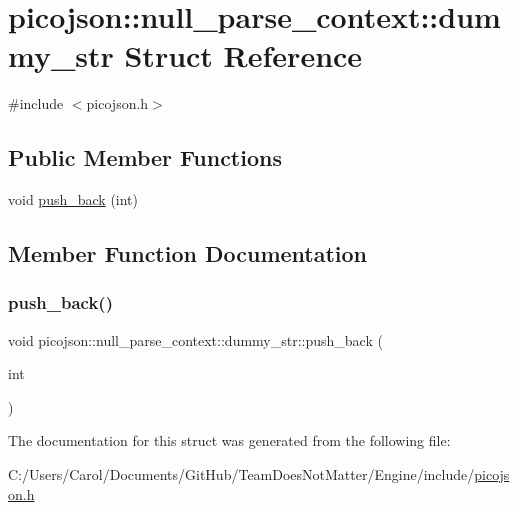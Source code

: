\hypertarget{structpicojson_1_1null__parse__context_1_1dummy__str}{}\section{picojson\+:\+:null\+\_\+parse\+\_\+context\+:\+:dummy\+\_\+str Struct Reference}
\label{structpicojson_1_1null__parse__context_1_1dummy__str}


{\ttfamily \#include $<$picojson.\+h$>$}

\subsection*{Public Member Functions}
\begin{DoxyCompactItemize}
\item 
void \hyperlink{structpicojson_1_1null__parse__context_1_1dummy__str_ac2b5c5eca1014b268b4c5a2a87d8923c}{push\+\_\+back} (int)
\end{DoxyCompactItemize}


\subsection{Member Function Documentation}
\hypertarget{structpicojson_1_1null__parse__context_1_1dummy__str_ac2b5c5eca1014b268b4c5a2a87d8923c}{}\label{structpicojson_1_1null__parse__context_1_1dummy__str_ac2b5c5eca1014b268b4c5a2a87d8923c} 
\subsubsection{\texorpdfstring{push\+\_\+back()}{push\_back()}}
{\footnotesize\ttfamily void picojson\+::null\+\_\+parse\+\_\+context\+::dummy\+\_\+str\+::push\+\_\+back (\begin{DoxyParamCaption}\item[{int}]{ }\end{DoxyParamCaption})\hspace{0.3cm}{\ttfamily [inline]}}



The documentation for this struct was generated from the following file\+:\begin{DoxyCompactItemize}
\item 
C\+:/\+Users/\+Carol/\+Documents/\+Git\+Hub/\+Team\+Does\+Not\+Matter/\+Engine/include/\hyperlink{picojson_8h}{picojson.\+h}\end{DoxyCompactItemize}
